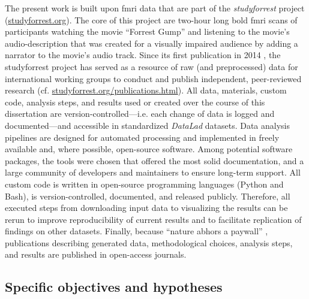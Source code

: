 %
The present work is built upon \ac{fmri} data that are part of the
\textit{studyforrest} project
(\href{www.studyforrest.org}{\url{studyforrest.org}}).
The core of this project are two-hour long \ac{bold} \ac{fmri} scans of
participants watching the movie ``Forrest Gump'' \citep{ForrestGumpMovie} and
listening to the movie's audio-description that was created for a visually
impaired audience by adding a narrator to the movie's audio track.
Since its first publication in 2014 \citep{hanke2014audiomovie}, the
studyforrest project has served as a resource of raw (and preprocessed) data for
international working groups to conduct and publish independent, peer-reviewed
research (cf.
\href{www.studyforrest.org/publications.html}{\url{studyforrest.org/publications.html}}).
All data, materials, custom code, analysis steps, and results used or created
over the course of this dissertation are version-controlled---i.e. each change
of data is logged and documented---and accessible in standardized
\textit{DataLad}
\citep[\href{www.datalad.org}{\url{datalad.org}};][]{halchenko2021datalad}
datasets.
Data analysis pipelines are designed for automated processing and implemented in
freely available and, where possible, open-source software.
Among potential software packages, the tools were chosen that offered the most
solid documentation, and a large community of developers and maintainers to
ensure long-term support.
All custom code is written in open-source programming languages (Python and
Bash), is version-controlled, documented, and released publicly.
Therefore, all executed steps from downloading input data to visualizing the
results can be rerun to improve reproducibility of current results and to
facilitate replication of findings on other datasets.
Finally, because ``nature abhors a paywall'' \citep{dupre2020nature},
publications describing generated data, methodological choices, analysis steps,
and results are published in open-access journals.



\subsection{Specific objectives and hypotheses}

